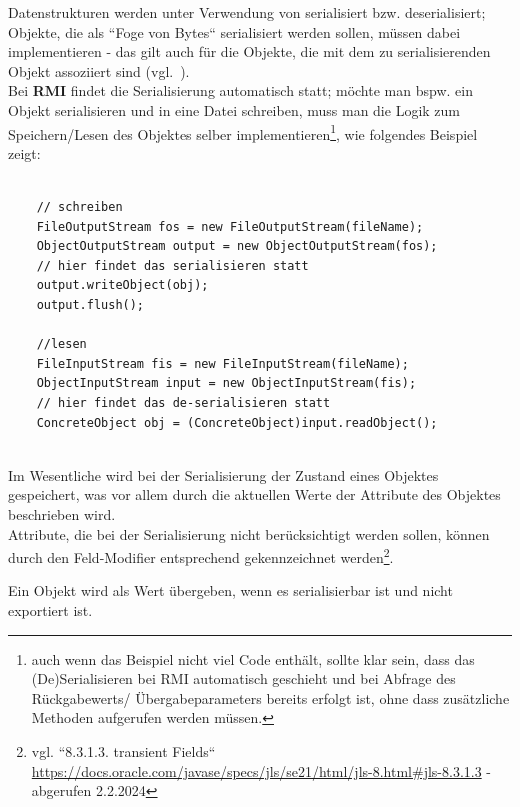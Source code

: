 Datenstrukturen werden unter Verwendung von  serialisiert {bzw.} deserialisiert; Objekte, die als ``Foge von Bytes`` serialisiert werden sollen, müssen dabei  implementieren  - das gilt auch für die Objekte, die mit dem zu serialisierenden Objekt assoziiert sind (vgl.~\cite[332]{Oec22}).\\

\noindent
Bei \textbf{RMI} findet die Serialisierung automatisch statt; möchte man {bspw.} ein Objekt serialisieren und in eine Datei schreiben, muss man die Logik zum Speichern/Lesen des Objektes selber implementieren\footnote{
auch wenn das Beispiel nicht viel Code enthält, sollte klar sein, dass das (De)Serialisieren bei RMI automatisch geschieht und bei Abfrage des Rückgabewerts/ Übergabeparameters bereits erfolgt ist, ohne dass zusätzliche Methoden aufgerufen werden müssen.
}, wie folgendes Beispiel zeigt:\\

\begin{verbatim}

    // schreiben
    FileOutputStream fos = new FileOutputStream(fileName);
    ObjectOutputStream output = new ObjectOutputStream(fos);
    // hier findet das serialisieren statt
    output.writeObject(obj);
    output.flush();

    //lesen
    FileInputStream fis = new FileInputStream(fileName);
    ObjectInputStream input = new ObjectInputStream(fis);
    // hier findet das de-serialisieren statt
    ConcreteObject obj = (ConcreteObject)input.readObject();
\end{verbatim}\\

\noindent
Im Wesentliche wird bei der Serialisierung der Zustand eines Objektes gespeichert, was vor allem durch die aktuellen Werte der Attribute des Objektes beschrieben wird.\\

\noindent
Attribute, die bei der Serialisierung nicht berücksichtigt werden sollen, können durch den Feld-Modifier  entsprechend gekennzeichnet werden\footnote{
vgl. ``8.3.1.3. transient Fields`` \url{https://docs.oracle.com/javase/specs/jls/se21/html/jls-8.html#jls-8.3.1.3} - abgerufen 2.2.2024
}.


\begin{tcolorbox}[enlarge top by=0.5cm,enlarge bottom by=0.5cm]
    Ein Objekt wird als Wert übergeben, wenn es serialisierbar ist und nicht exportiert ist.
\end{tcolorbox}


